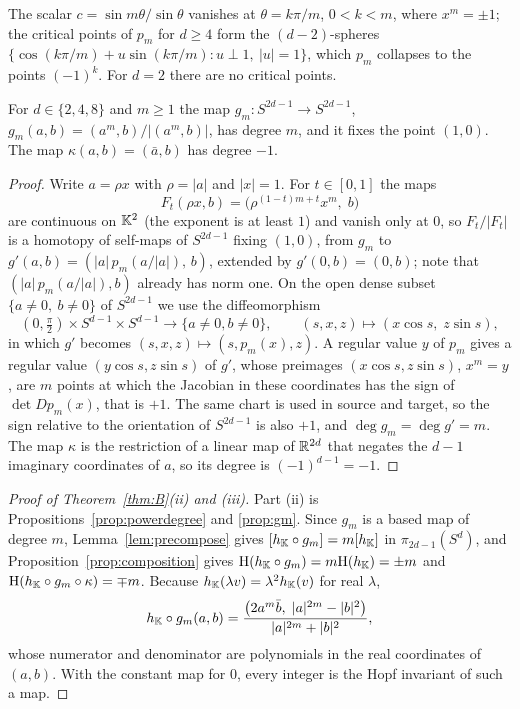 \begin{remark}
The scalar $c=\sin m\theta/\sin\theta$ vanishes at $\theta=k\pi/m$, $0<k<m$, where $x^m=\pm1$; the critical points of $p_m$ for $d\ge4$ form the $(d-2)$-spheres $\{\cos(k\pi/m)+u\sin(k\pi/m):u\perp1,\ |u|=1\}$, which $p_m$ collapses to the points $(-1)^k$. For $d=2$ there are no critical points.
\end{remark}

\begin{proposition}\label{prop:gm}
For $d\in\{2,4,8\}$ and $m\ge1$ the map $g_m\colon S^{2d-1}\to S^{2d-1}$, $g_m(a,b)=(a^m,b)/|(a^m,b)|$, has degree $m$, and it fixes the point $(1,0)$. The map $\kappa(a,b)=(\bar a,b)$ has degree $-1$.
\end{proposition}

\begin{proof}
Write $a=\rho x$ with $\rho=|a|$ and $|x|=1$. For $t\in[0,1]$ the maps
\[
F_t(\rho x,b)=\bigl(\rho^{(1-t)m+t}x^m,\;b\bigr)
\]
are continuous on $\mathbb{K}^2$ (the exponent is at least $1$) and vanish only at $0$, so $F_t/|F_t|$ is a homotopy of self-maps of $S^{2d-1}$ fixing $(1,0)$, from $g_m$ to $g'(a,b)=(|a|\,p_m(a/|a|),\,b)$, extended by $g'(0,b)=(0,b)$; note that $(|a|\,p_m(a/|a|),b)$ already has norm one. On the open dense subset $\{a\neq0,\ b\neq0\}$ of $S^{2d-1}$ we use the diffeomorphism
\[
(0,\tfrac{\pi}{2})\times S^{d-1}\times S^{d-1}\to\{a\ne0,b\ne0\},\qquad (s,x,z)\mapsto(x\cos s,\;z\sin s),
\]
in which $g'$ becomes $(s,x,z)\mapsto(s,p_m(x),z)$. A regular value $y$ of $p_m$ gives a regular value $(y\cos s,z\sin s)$ of $g'$, whose preimages $(x\cos s,z\sin s)$, $x^m=y$, are $m$ points at which the Jacobian in these coordinates has the sign of $\det Dp_m(x)$, that is $+1$. The same chart is used in source and target, so the sign relative to the orientation of $S^{2d-1}$ is also $+1$, and $\deg g_m=\deg g'=m$. The map $\kappa$ is the restriction of a linear map of $\mathbb{R}^{2d}$ that negates the $d-1$ imaginary coordinates of $a$, so its degree is $(-1)^{d-1}=-1$.
\end{proof}

\begin{proof}[Proof of Theorem~\ref{thm:B}\textup{(ii)} and \textup{(iii)}]
Part (ii) is Propositions~\ref{prop:powerdegree} and \ref{prop:gm}. Since $g_m$ is a based map of degree $m$, Lemma~\ref{lem:precompose} gives $[h_{\mathbb{K}}\circ g_m]=m[h_{\mathbb{K}}]$ in $\pi_{2d-1}(S^d)$, and Proposition~\ref{prop:composition} gives $\mathrm{H}(h_{\mathbb{K}}\circ g_m)=m\mathrm{H}(h_{\mathbb{K}})=\pm m$ and $\mathrm{H}(h_{\mathbb{K}}\circ g_m\circ\kappa)=\mp m$. Because $h_{\mathbb{K}}(\lambda v)=\lambda^2h_{\mathbb{K}}(v)$ for real $\lambda$,
\begin{equation}\label{eq:hgm}
h_{\mathbb{K}}\circ g_m(a,b)=\frac{\bigl(2a^m\bar b,\;|a|^{2m}-|b|^2\bigr)}{|a|^{2m}+|b|^2},
\end{equation}
whose numerator and denominator are polynomials in the real coordinates of $(a,b)$. With the constant map for $0$, every integer is the Hopf invariant of such a map.
\end{proof}

